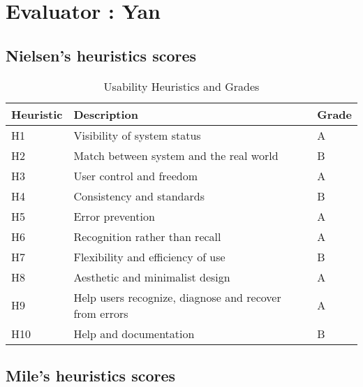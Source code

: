 
\section{Evaluator : Yan} 
\subsection{Nielsen’s heuristics scores}
\begin{table}[h]
	\centering
	\caption{Usability Heuristics and Grades}
	\label{tab:usabilityHeuristicsGrades}
	\begin{tabular}{|l|l|l|}
		\hline
		\textbf{Heuristic} & \textbf{Description}                                & \textbf{Grade} \\ \hline
		H1                 & Visibility of system status                         & A              \\ \hline
		H2                 & Match between system and the real world             & B              \\ \hline
		H3                 & User control and freedom                            & A              \\ \hline
		H4                 & Consistency and standards                           & B              \\ \hline
		H5                 & Error prevention                                    & A              \\ \hline
		H6                 & Recognition rather than recall                      & A              \\ \hline
		H7                 & Flexibility and efficiency of use                   & B              \\ \hline
		H8                 & Aesthetic and minimalist design                     & A              \\ \hline
		H9                 & Help users recognize, diagnose and recover from errors & A           \\ \hline
		H10                & Help and documentation                              & B              \\ \hline
	\end{tabular}
\end{table}

\subsection{Mile’s heuristics scores}

